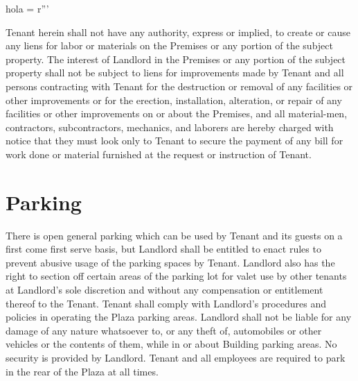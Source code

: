 hola = r'''\documentclass{article}
\begin{document}
    Tenant herein shall not have any authority, express or implied, to create or cause any liens for labor or materials on the Premises or any portion of the subject property.  The interest of Landlord in the Premises or any portion of the subject property shall not be subject to liens for improvements made by Tenant and all persons contracting with Tenant for the destruction or removal of any facilities or other improvements or for the erection, installation, alteration, or repair of any facilities or other improvements on or about the Premises, and all material-men, contractors, subcontractors, mechanics, and laborers are hereby charged with notice that they must look only to Tenant to secure the payment of any bill for work done or material furnished at the request or instruction of Tenant.

\section{Parking}
    There is open general parking which can be used by Tenant and its guests on a first come first serve basis, but Landlord shall be entitled to enact rules to prevent abusive usage of the parking spaces by Tenant.  Landlord also has the right to section off certain areas of the parking lot for valet use by other tenants at Landlord’s sole discretion and without any compensation or entitlement thereof to the Tenant. Tenant shall comply with Landlord's procedures and policies in operating the Plaza parking areas. Landlord shall not be liable for any damage of any nature whatsoever to, or any theft of, automobiles or other vehicles or the contents of them, while in or about Building parking areas.  No security is provided by Landlord. Tenant and all employees are required to park in the rear of the Plaza at all times.
\end{document}
